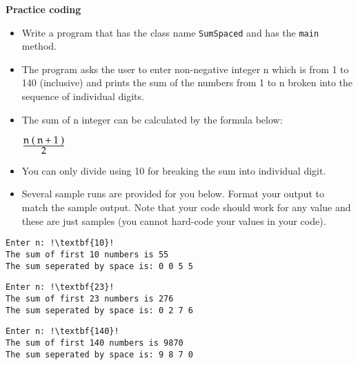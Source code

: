 \documentclass[12pt]{article}
\begin{document}
\vspace*{0.5cm}
\textbf{Practice coding}
\begin{itemize}
	\item Write a program that has the class name \texttt{SumSpaced} and has the \texttt{main} method.
	\item The program asks the user to enter non-negative integer n which is from 1 to 140 (inclusive) and prints the sum of the numbers from 1 to n broken into the sequence of individual digits.
	\item The sum of  n integer can be calculated by the formula below:
\begin{center}
	$\rm\frac{\mathtt{\displaystyle}\displaystyle n \;(\;n+1\;)}{\displaystyle 2}$
\end{center}	
	\item You can only divide using 10 for breaking the sum into individual digit.
	\item Several sample runs are provided for you below. Format your output to match the sample output. Note that your code should work for any value and these are just samples (you cannot hard-code your values in your code).
\end{itemize}
\begin{center}
\begin{minipage}{6.5cm}
\begin{lstlisting}[escapechar=!]
Enter n: !\textbf{10}!
The sum of first 10 numbers is 55
The sum seperated by space is: 0 0 5 5
\end{lstlisting}
\end{minipage}
\hspace*{0.5cm}
\begin{minipage}{6.5cm}
\begin{lstlisting}[escapechar=!]
Enter n: !\textbf{23}!
The sum of first 23 numbers is 276
The sum seperated by space is: 0 2 7 6
\end{lstlisting}
\end{minipage}
\hspace*{0.5cm}
\begin{minipage}{6.5cm}
\begin{lstlisting}[escapechar=!]
Enter n: !\textbf{140}!
The sum of first 140 numbers is 9870
The sum seperated by space is: 9 8 7 0
\end{lstlisting}
\end{minipage}
\end{center}
	
\end{document}
